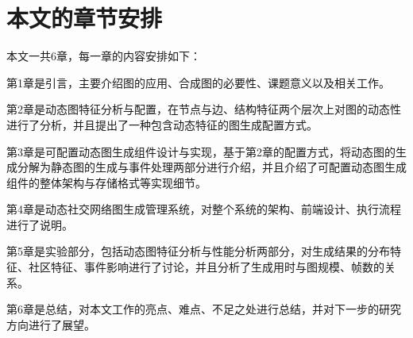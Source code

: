 \section{本文的章节安排}

本文一共6章，每一章的内容安排如下：

第1章是引言，主要介绍图的应用、合成图的必要性、课题意义以及相关工作。

第2章是动态图特征分析与配置，在节点与边、结构特征两个层次上对图的动态性进行了分析，并且提出了一种包含动态特征的图生成配置方式。

第3章是可配置动态图生成组件设计与实现，基于第2章的配置方式，将动态图的生成分解为静态图的生成与事件处理两部分进行介绍，并且介绍了可配置动态图生成组件的整体架构与存储格式等实现细节。

第4章是动态社交网络图生成管理系统，对整个系统的架构、前端设计、执行流程进行了说明。

第5章是实验部分，包括动态图特征分析与性能分析两部分，对生成结果的分布特征、社区特征、事件影响进行了讨论，并且分析了生成用时与图规模、帧数的关系。

第6章是总结，对本文工作的亮点、难点、不足之处进行总结，并对下一步的研究方向进行了展望。